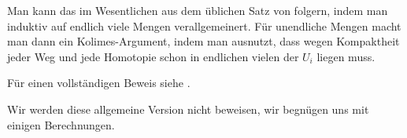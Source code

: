 \begin{oral}
    Man kann das im Wesentlichen aus dem üblichen Satz von    folgern, indem man induktiv auf endlich viele Mengen verallgemeinert. Für unendliche Mengen macht man dann ein Kolimes-Argument, indem man ausnutzt, dass wegen Kompaktheit jeder Weg und jede Homotopie schon in endlichen vielen der $U_i$ liegen muss.

    Für einen vollständigen Beweis siehe  \cite[Satz 1.20]{algebraic-topology-hatcher}.
\end{oral}

Wir werden diese allgemeine Version nicht beweisen, wir begnügen uns mit einigen Berechnungen.

